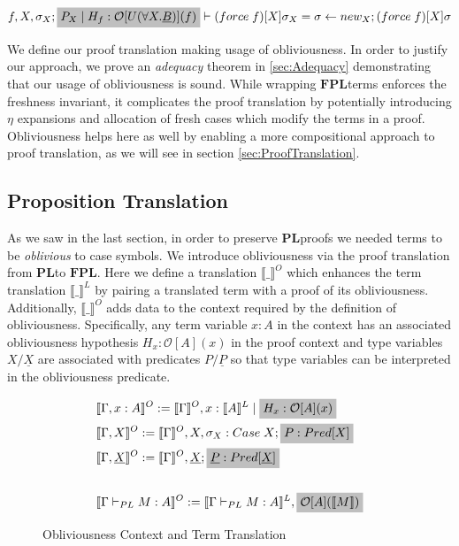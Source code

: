 \documentclass[acmsmall]{acmart}
\newcommand{\den}[1]{\llbracket #1\rrbracket}
\newcommand{\pl}{$\mathbf{PL}$}
\newcommand{\fpl}{$\mathbf{FPL}$}
\begin{document}
\begin{equation}
  \label{eqn:Obliv2}
  f,X,\sigma_X;\colorbox{lightgray}{$P_X \;|\; H_f : \mathcal{O}[U(\forall X. \underline{B})](f) $} \vdash (force\;f)[X]\sigma_X = \sigma \leftarrow new_X;(force\;f)[X]\sigma
\end{equation}

We define our proof translation making usage of obliviousness.
In order to justify our approach, we prove an \textit{adequacy} theorem in \cref{sec:Adequacy} demonstrating that our usage of obliviousness is sound. While wrapping \fpl\;terms enforces the freshness invariant, it complicates the proof translation by potentially introducing $\eta$ expansions and allocation of fresh cases which modify the terms in a proof. Obliviousness helps here as well by enabling a more compositional approach to proof translation, as we will see in section \cref{sec:ProofTranslation}. 


\subsection{Proposition Translation}\label{sec:PropTranslation}
As we saw in the last section, in order to preserve \pl\;proofs we needed terms to be \textit{oblivious} to case symbols. We introduce obliviousness via the proof translation from \pl\;to \fpl. Here we define a translation $\den{\_}^O$ which enhances the term translation $\den{\_}^L$ by pairing a translated term with a proof of its obliviousness. Additionally, $\den{\_}^O$ adds data to the context required by the definition of obliviousness. Specifically, any term variable $x :A$ in the context has an associated obliviousness hypothesis $H_x : \mathcal{O}[A](x)$ in the proof context and type variables $X/\underline{X}$ are associated with predicates $P/\underline{P}$ so that type variables can be interpreted in the obliviousness predicate. 



\begin{figure}[H]
  \centering
  \scriptsize
  \begin{align*} 
    &\den{\Gamma,x:A}^O := \den{\Gamma}^O,x : \den{A}^L \;|\; \colorbox{lightgray}{$H_x : \mathcal{O}[A](x)$}\\
    &\den{\Gamma,X}^O := \den{\Gamma}^O,X,\sigma_X : Case\;X ; \colorbox{lightgray}{$P : Pred[X]$}\\
    &\den{\Gamma,\underline{X}}^O := \den{\Gamma}^O,\underline{X};\colorbox{lightgray}{$\underline{P} : Pred[\underline{X}]$}\\
    \\
    &\den{\Gamma \vdash_{PL} M : A}^O := \den{\Gamma \vdash_{PL} M : A}^L, \colorbox{lightgray}{$\mathcal{O}[A](\den{M})$} 
  \end{align*}
  \caption{Obliviousness Context and Term Translation}
  \label{fig:d}
\end{figure}
\end{document}
